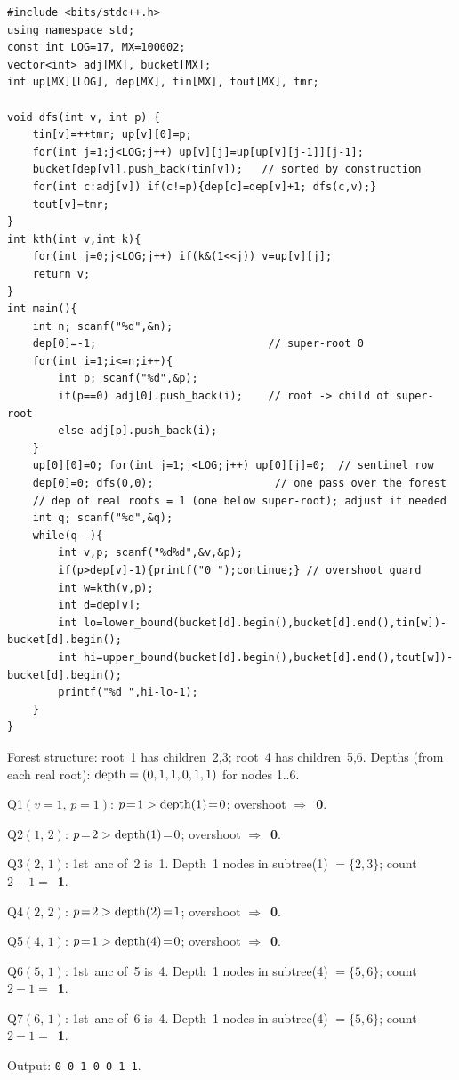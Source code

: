\begin{lstlisting}[caption={CF 208E full solution (super-root 0; lifting + depth buckets)}, label={lst:c11-208e-soln}]
#include <bits/stdc++.h>
using namespace std;
const int LOG=17, MX=100002;
vector<int> adj[MX], bucket[MX];
int up[MX][LOG], dep[MX], tin[MX], tout[MX], tmr;

void dfs(int v, int p) {
    tin[v]=++tmr; up[v][0]=p;
    for(int j=1;j<LOG;j++) up[v][j]=up[up[v][j-1]][j-1];
    bucket[dep[v]].push_back(tin[v]);   // sorted by construction
    for(int c:adj[v]) if(c!=p){dep[c]=dep[v]+1; dfs(c,v);}
    tout[v]=tmr;
}
int kth(int v,int k){
    for(int j=0;j<LOG;j++) if(k&(1<<j)) v=up[v][j];
    return v;
}
int main(){
    int n; scanf("%d",&n);
    dep[0]=-1;                           // super-root 0
    for(int i=1;i<=n;i++){
        int p; scanf("%d",&p);
        if(p==0) adj[0].push_back(i);    // root -> child of super-root
        else adj[p].push_back(i);
    }
    up[0][0]=0; for(int j=1;j<LOG;j++) up[0][j]=0;  // sentinel row
    dep[0]=0; dfs(0,0);                   // one pass over the forest
    // dep of real roots = 1 (one below super-root); adjust if needed
    int q; scanf("%d",&q);
    while(q--){
        int v,p; scanf("%d%d",&v,&p);
        if(p>dep[v]-1){printf("0 ");continue;} // overshoot guard
        int w=kth(v,p);
        int d=dep[v];
        int lo=lower_bound(bucket[d].begin(),bucket[d].end(),tin[w])-bucket[d].begin();
        int hi=upper_bound(bucket[d].begin(),bucket[d].end(),tout[w])-bucket[d].begin();
        printf("%d ",hi-lo-1);
    }
}
\end{lstlisting}

\begin{tracebox}
Forest structure: root~1 has children~{2,3}; root~4 has children~{5,6}.
Depths (from each real root): $\operatorname{depth} = (0,1,1,0,1,1)$ for nodes 1..6.

Q1\;$(v\!=\!1,\, p\!=\!1)$: $p\!=\!1 > \operatorname{depth}(1)\!=\!0$; overshoot
$\Rightarrow$~\textbf{0}. \checkmark

Q2\;$(1,\,2)$: $p\!=\!2 > \operatorname{depth}(1)\!=\!0$; overshoot
$\Rightarrow$~\textbf{0}. \checkmark

Q3\;$(2,\,1)$: 1st~anc of~2 is~1.  Depth~1 nodes in subtree(1)
$= \{2,3\}$; count~$2 - 1 = $~\textbf{1}. \checkmark

Q4\;$(2,\,2)$: $p\!=\!2 > \operatorname{depth}(2)\!=\!1$; overshoot
$\Rightarrow$~\textbf{0}. \checkmark

Q5\;$(4,\,1)$: $p\!=\!1 > \operatorname{depth}(4)\!=\!0$; overshoot
$\Rightarrow$~\textbf{0}. \checkmark

Q6\;$(5,\,1)$: 1st~anc of~5 is~4.  Depth~1 nodes in subtree(4)
$= \{5,6\}$; count~$2 - 1 = $~\textbf{1}. \checkmark

Q7\;$(6,\,1)$: 1st~anc of~6 is~4.  Depth~1 nodes in subtree(4)
$= \{5,6\}$; count~$2 - 1 = $~\textbf{1}. \checkmark

Output: \texttt{0 0 1 0 0 1 1}. \checkmark
\end{tracebox}

